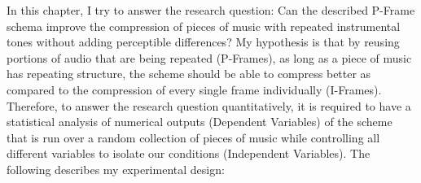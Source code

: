 \label{chapter:Exp}

In this chapter, I try to answer the research question: Can the described P-Frame schema improve the compression of pieces of music with repeated instrumental tones without adding perceptible differences? My hypothesis is that by reusing portions of audio that are being repeated (P-Frames), as long as a piece of music has repeating structure, the scheme should be able to compress better as compared to the compression of every single frame individually (I-Frames). Therefore, to answer the research question quantitatively, it is required to have a statistical analysis of numerical outputs (Dependent Variables) of the scheme that is run over a random collection of pieces of music while controlling all different variables to isolate our conditions (Independent Variables). The following describes my experimental design:

